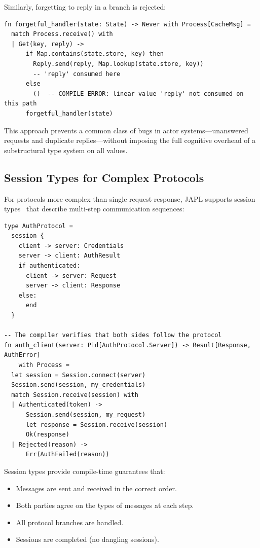 \documentclass[11pt,a4paper]{article}
\begin{document}
Similarly, forgetting to reply in a branch is rejected:

\begin{lstlisting}[language=japl,caption={Compile error: Reply not consumed on all paths}]
fn forgetful_handler(state: State) -> Never with Process[CacheMsg] =
  match Process.receive() with
  | Get(key, reply) ->
      if Map.contains(state.store, key) then
        Reply.send(reply, Map.lookup(state.store, key))
        -- 'reply' consumed here
      else
        ()  -- COMPILE ERROR: linear value 'reply' not consumed on this path
      forgetful_handler(state)
\end{lstlisting}

This approach prevents a common class of bugs in actor systems---unanswered requests and duplicate replies---without imposing the full cognitive overhead of a substructural type system on all values.

\subsection{Session Types for Complex Protocols}

For protocols more complex than single request-response, JAPL supports session types~\citep{honda1993types} that describe multi-step communication sequences:

\begin{lstlisting}[language=japl,caption={Session-typed protocol}]
type AuthProtocol =
  session {
    client -> server: Credentials
    server -> client: AuthResult
    if authenticated:
      client -> server: Request
      server -> client: Response
    else:
      end
  }

-- The compiler verifies that both sides follow the protocol
fn auth_client(server: Pid[AuthProtocol.Server]) -> Result[Response, AuthError]
    with Process =
  let session = Session.connect(server)
  Session.send(session, my_credentials)
  match Session.receive(session) with
  | Authenticated(token) ->
      Session.send(session, my_request)
      let response = Session.receive(session)
      Ok(response)
  | Rejected(reason) ->
      Err(AuthFailed(reason))
\end{lstlisting}

Session types provide compile-time guarantees that:
\begin{itemize}
\item Messages are sent and received in the correct order.
\item Both parties agree on the types of messages at each step.
\item All protocol branches are handled.
\item Sessions are completed (no dangling sessions).
\end{itemize}
\end{document}
